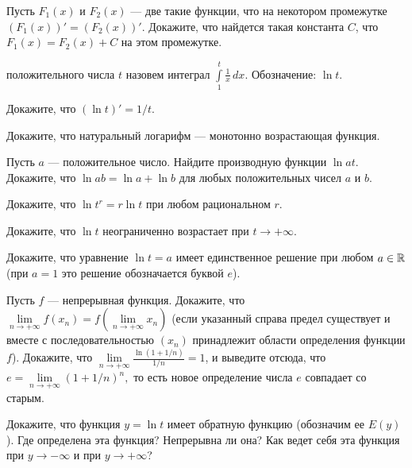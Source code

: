 \documentclass[a4paper, 12pt]{article}
\begin{document}


\smallskip

Пусть $F_1(x)$ и $F_2(x)$ --- две такие функции, что на некотором промежутке
$(F_1(x))'=(F_2(x))'$. Докажите, что найдется такая
константа $C$, что $F_1(x)=F_2(x)+C$ на этом промежутке.


 положительного числа $t$ назовем
интеграл $\int\limits_1^t\frac1x\,dx$. Обозначение: $\ln t$.

Докажите, что $(\ln t)'=1/t$.

Докажите, что натуральный логарифм --- монотонно возрастающая функция.

Пусть $a$ --- положительное число. Найдите производную
функции $\ln at$.\\
Докажите, что $\ln ab=\ln a+\ln b$ для любых положительных чисел $a$ и $b$.

Докажите, что
$\ln t^r=r\ln t$ при любом рациональном $r$.

Докажите, что $\ln t$ неограниченно возрастает при $t\rightarrow+\infty$.

Докажите, что уравнение $\ln t=a$ имеет единственное %
решение при любом  $a\in\mathbb{R}$
(при $a=1$ это решение обозначается буквой $e$).


 Пусть $f$ --- непрерывная функция. Докажите, что
$\lim\limits_{n\rightarrow+\infty}f(x_n)=
f\left(\lim\limits_{n\rightarrow+\infty}x_n\right)$
(если указанный справа предел существует и вместе с последовательностью
$(x_n)$ принадлежит области определения функции $f$).
Докажите, что
$\displaystyle\lim\limits_{n\rightarrow+\infty}\frac{\ln
(1+1/n)}{1/n}=1$, и выведите отсюда, что
$e=\lim\limits_{n\rightarrow+\infty}\left(1+1/n\right)^{n},$
то есть новое определение числа $e$ совпадает со старым.

Докажите, что функция $y=\ln t$ имеет обратную функцию
(обозначим ее $E(y)$). Где определена эта функция?
Непрерывна ли она?
Как ведет себя эта функция при $y\rightarrow-\infty$ и
при $y\rightarrow+\infty$?
\end{document}
